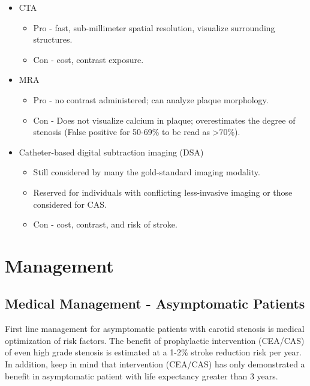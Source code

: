\documentclass[
]{book}
\begin{document}
\begin{enumerate}
  \begin{itemize}
  \item
    CTA

    \begin{itemize}
    \item
      Pro - fast, sub-millimeter spatial resolution, visualize
      surrounding structures.
    \item
      Con - cost, contrast exposure.
    \end{itemize}
  \item
    MRA

    \begin{itemize}
    \item
      Pro - no contrast administered; can analyze plaque
      morphology.
    \item
      Con - Does not visualize calcium in plaque; overestimates
      the degree of stenosis (False positive for 50-69\% to be read
      as \textgreater70\%).
    \end{itemize}
  \item
    Catheter-based digital subtraction imaging (DSA)

    \begin{itemize}
    \item
      Still considered by many the gold-standard imaging modality.
    \item
      Reserved for individuals with conflicting less-invasive
      imaging or those considered for CAS.
    \item
      Con - cost, contrast, and risk of stroke.
    \end{itemize}
  \end{itemize}
\end{enumerate}

\hypertarget{management}{%
\section{Management}\label{management}}

\hypertarget{medical-management---asymptomatic-patients}{%
\subsection{Medical Management - Asymptomatic Patients}\label{medical-management---asymptomatic-patients}}

First line management for asymptomatic patients with carotid stenosis is
medical optimization of risk factors. The benefit of prophylactic
intervention (CEA/CAS) of even high grade stenosis is estimated at a
1-2\% stroke reduction risk per year.
\citep{naylorWhyManagementAsymptomatic2015} In addition, keep in mind that
intervention (CEA/CAS) has only demonstrated a benefit in asymptomatic
patient with life expectancy greater than 3 years.
\citep{bulbuliaAsymptomaticCarotidSurgery2017, halliday10yearStrokePrevention2010, rosenfieldRandomizedTrialStent2016}
\end{document}

